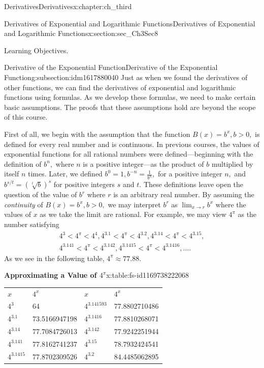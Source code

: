\documentclass[oneside,10pt,]{book}
\newcommand{\tabularfont}{\relax}
\numberwithin{equation}{section}
\newcommand{\lt}{<}
\newcommand{\gt}{>}
\begin{document}
\begin{chapterptx}{Derivatives}{}{Derivatives}{}{}{x:chapter:ch_third}
\begin{sectionptx}{Derivatives of Exponential and Logarithmic Functions}{}{Derivatives of Exponential and Logarithmic Functions}{}{}{x:section:sec_Ch3Sec8}
\begin{introduction}{Learning Objectives.}
\end{introduction}%
%
%
\typeout{************************************************}
\typeout{************************************************}
%
\begin{subsectionptx}{Derivative of the Exponential Function}{}{Derivative of the Exponential Function}{}{}{g:subsection:idm1617880040}
Just as when we found the derivatives of other functions, we can find the derivatives of exponential and logarithmic functions using formulas. As we develop these formulas, we need to make certain basic assumptions. The proofs that these assumptions hold are beyond the scope of this course.%
\par
First of all, we begin with the assumption that the function \(B(x)=b^x,b\gt 0,\) is defined for every real number and is continuous. In previous courses, the values of exponential functions for all rational numbers were defined—beginning with the definition of \(b^n,\) where \(n\) is a positive integer—as the product of \(b\) multiplied by itself \(n\) times. Later, we defined \(b^0=1,b^{-n}=\frac{1}{b^n},\) for a positive integer \(n,\) and \(b^{s/t}=(\sqrt[t]{b})^s\) for positive integers \(s\) and \(t.\) These definitions leave open the question of the value of \(b^r\) where \(r\) is an arbitrary real number. By assuming the \emph{continuity} of \(B(x)=b^x,b\gt 0,\) we may interpret \(b^r\) as \(\lim_{x\to r}b^x\) where the values of \(x\) as we take the limit are rational. For example, we may view \(4^\pi\) as the number satisfying%
%
\begin{gather*}
4^3\lt 4^\pi\lt 4^4,4^{3.1}\lt 4^\pi\lt 4^{3.2},4^{3.14}\lt 4^\pi\lt 4^{3.15},\\
4^{3.141}\lt 4^\pi\lt 4^{3.142},4^{3.1415}\lt 4^\pi\lt 4^{3.1416}, \dots.
\end{gather*}
As we see in the following table, \(4^\pi\approx77.88.\)%
\begin{tableptx}{\textbf{Approximating a Value of \(4^\pi\)}}{x:table:fs-id1169738222068}{}%
\centering%
{\tabularfont%
\begin{tabular}{llll}
\textbf{\(x\)}&\textbf{\(4^x\)}&\textbf{\(x\)}&\textbf{\(4^x\)}\tabularnewline[0pt]
\(4^3\)&64&\(4^{3.141593}\)&77.8802710486\tabularnewline[0pt]
\(4^{3.1}\)&73.5166947198&\(4^{3.1416}\)&77.8810268071\tabularnewline[0pt]
\(4^{3.14}\)&77.7084726013&\(4^{3.142}\)&77.9242251944\tabularnewline[0pt]
\(4^{3.141}\)&77.8162741237&\(4^{3.15}\)&78.7932424541\tabularnewline[0pt]
\(4^{3.1415}\)&77.8702309526&\(4^{3.2}\)&84.4485062895\tabularnewline[0pt]

\end{tabular}}
\end{tableptx}
\end{subsectionptx}
\end{sectionptx}
\end{chapterptx}
\end{document}
